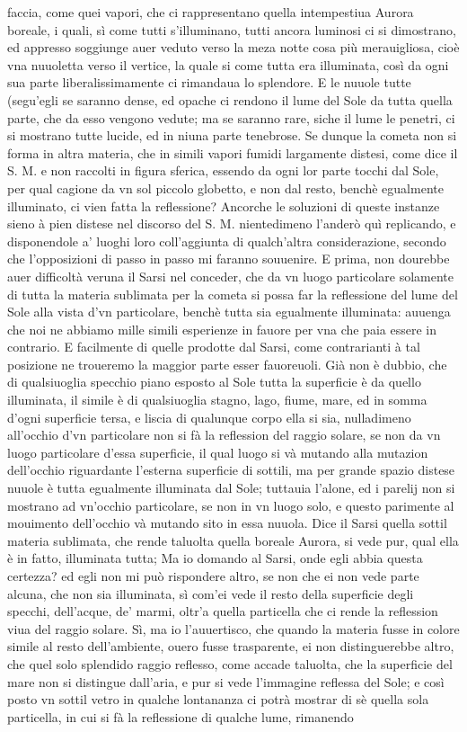 \documentclass[11pt,twoside,openany]{book}
\begin{document}
faccia, come quei vapori, che ci rappresentano quella intempestiua Aurora boreale, i quali, sì come tutti s'illuminano, tutti ancora luminosi ci si dimostrano, ed appresso soggiunge auer veduto verso la meza notte cosa più merauigliosa, cioè vna nuuoletta verso il vertice, la quale si come tutta era illuminata, così da ogni sua parte liberalissimamente ci rimandaua lo splendore. E le nuuole tutte (segu'egli se saranno dense, ed opache ci rendono il lume del Sole da tutta quella parte, che da esso vengono vedute; ma se saranno rare, siche il lume le penetri, ci si mostrano tutte lucide, ed in niuna parte tenebrose. Se dunque la cometa non si forma in altra materia, che in simili vapori fumidi largamente distesi, come dice il S. M. e non raccolti in figura sferica, essendo da ogni lor parte tocchi dal Sole, per qual cagione da vn sol piccolo globetto, e non dal resto, benchè egualmente illuminato, ci vien fatta la reflessione? Ancorche le soluzioni di queste instanze sieno à pien distese nel discorso del S. M. nientedimeno l'anderò quì replicando, e disponendole a' luoghi loro coll'aggiunta di qualch'altra considerazione, secondo che l'opposizioni di passo in passo mi faranno souuenire. E prima, non dourebbe auer difficoltà veruna il Sarsi nel conceder, che da vn luogo particolare solamente di tutta la materia sublimata per la cometa si possa far la reflessione del lume del Sole alla vista d'vn particolare, benchè tutta sia egualmente illuminata: auuenga che noi ne abbiamo mille simili esperienze in fauore per vna che paia essere in contrario. E facilmente di quelle prodotte dal Sarsi, come contrarianti à tal posizione ne troueremo la maggior parte esser fauoreuoli. Già non è dubbio, che di qualsiuoglia specchio piano esposto al Sole tutta la superficie è da quello illuminata, il simile è di qualsiuoglia stagno, lago, fiume, mare, ed in somma d'ogni superficie tersa, e liscia di qualunque corpo ella si sia, nulladimeno all'occhio d'vn particolare non si fà la reflession del raggio solare, se non da vn luogo particolare d'essa superficie, il qual luogo si và mutando alla mutazion dell'occhio riguardante l'esterna superficie di sottili, ma per grande spazio distese nuuole è tutta egualmente illuminata dal Sole; tuttauia l'alone, ed i parelij non si mostrano ad vn'occhio particolare, se non in vn luogo solo, e questo parimente al mouimento dell'occhio và mutando sito in essa nuuola. Dice il Sarsi quella sottil materia sublimata, che rende taluolta quella boreale Aurora, si vede pur, qual ella è in fatto, illuminata tutta; Ma io domando al Sarsi, onde egli abbia questa certezza? ed egli non mi può rispondere altro, se non che ei non vede parte alcuna, che non sia illuminata, sì com'ei vede il resto della superficie degli specchi, dell'acque, de' marmi, oltr'a quella particella che ci rende la reflession viua del raggio solare. Sì, ma io l'auuertisco, che quando la materia fusse in colore simile al resto dell'ambiente, ouero fusse trasparente, ei non distinguerebbe altro, che quel solo splendido raggio reflesso, come accade taluolta, che la superficie del mare non si distingue dall'aria, e pur si vede l'immagine reflessa del Sole; e così posto vn sottil vetro in qualche lontananza ci potrà mostrar di sè quella sola particella, in cui si fà la reflessione di qualche lume, rimanendo 
\end{document}
